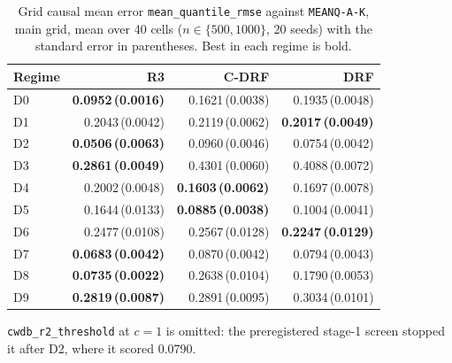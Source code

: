 \begin{table}[htbp]
\centering
\caption{Grid causal mean error \texttt{mean\_quantile\_rmse} against \texttt{MEANQ-A-K}, main grid, mean over 40 cells ($n\in\{500,1000\}$, 20 seeds) with the standard error in parentheses. Best in each regime is bold.}
\label{tab:all-meanq}
\scriptsize
\setlength{\tabcolsep}{3.2pt}
\begin{tabular}{@{}lrrr@{}}
\toprule
Regime & R3 & C-DRF & DRF \\
\midrule
D0 & \textbf{0.0952\,(0.0016)} & 0.1621\,(0.0038) & 0.1935\,(0.0048) \\
D1 & 0.2043\,(0.0042) & 0.2119\,(0.0062) & \textbf{0.2017\,(0.0049)} \\
D2 & \textbf{0.0506\,(0.0063)} & 0.0960\,(0.0046) & 0.0754\,(0.0042) \\
D3 & \textbf{0.2861\,(0.0049)} & 0.4301\,(0.0060) & 0.4088\,(0.0072) \\
D4 & 0.2002\,(0.0048) & \textbf{0.1603\,(0.0062)} & 0.1697\,(0.0078) \\
D5 & 0.1644\,(0.0133) & \textbf{0.0885\,(0.0038)} & 0.1004\,(0.0041) \\
D6 & 0.2477\,(0.0108) & 0.2567\,(0.0128) & \textbf{0.2247\,(0.0129)} \\
D7 & \textbf{0.0683\,(0.0042)} & 0.0870\,(0.0042) & 0.0794\,(0.0043) \\
D8 & \textbf{0.0735\,(0.0022)} & 0.2638\,(0.0104) & 0.1790\,(0.0053) \\
D9 & \textbf{0.2819\,(0.0087)} & 0.2891\,(0.0095) & 0.3034\,(0.0101) \\
\bottomrule
\end{tabular}
\par\vspace{2pt}\parbox{\textwidth}{\scriptsize \texttt{cwdb\_r2\_threshold} at $c=1$ is omitted: the preregistered stage-1 screen stopped it after D2, where it scored 0.0790.}
\end{table}

